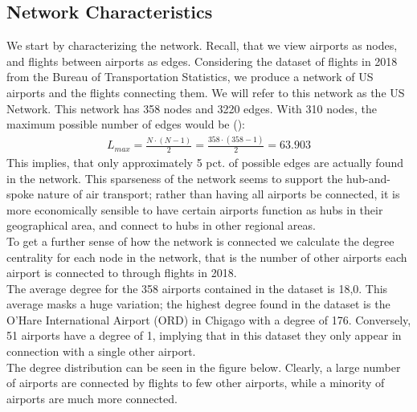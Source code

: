 \label{sec:empirical}
\subsection{Network Characteristics}
We start by characterizing the network. Recall, that we view airports as nodes, and flights between airports as edges. Considering the dataset of flights in 2018 from the Bureau of Transportation Statistics, we produce a network of US airports and the flights connecting them. We will refer to this network as the US Network. This network has 358 nodes and 3220 edges. With 310 nodes, the maximum possible number of edges would be (\cite{Barabasi Networks}): 
\begin{align}
    L_{max}  = \frac{N\cdot(N-1)}{2}=\frac{358\cdot(358-1)}{2} = 63.903
\end{align}
This implies, that only approximately 5 pct. of possible edges are actually found in the network. 
This sparseness of the network seems to support the hub-and-spoke nature of air transport; rather than having all airports be connected, it is more economically sensible to have certain airports function as hubs in their geographical area, and connect to hubs in other regional areas. \\ 
To get a further sense of how the network is connected we calculate the degree centrality for each node in the network, that is the number of other airports each airport is connected to through flights in 2018. \\
The average degree for the 358 airports contained in the dataset is 18,0. This average masks a huge variation; the highest degree found in the dataset is the O'Hare International Airport (ORD) in Chigago with a degree of 176.  Conversely, 51 airports have a degree of 1, implying that in this dataset they only appear in connection with a single other airport. \\
The degree distribution can be seen in the figure below. Clearly, a large number of airports are connected by flights to few other airports, while a minority of airports are much more connected.

